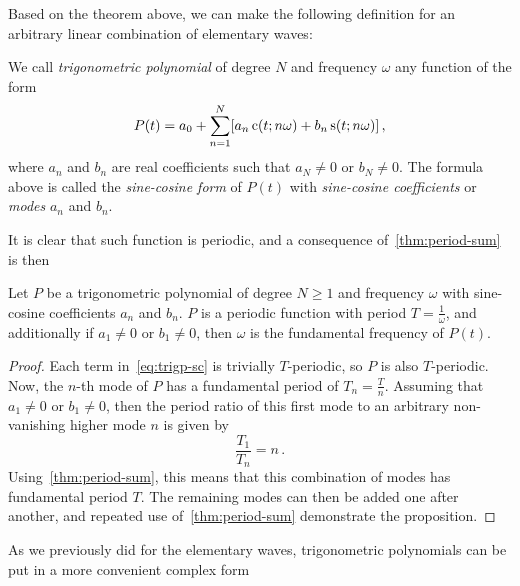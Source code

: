 Based on the theorem above, we can make the following definition for an arbitrary linear
combination of elementary waves:
\begin{definition}
  We call \emph{trigonometric polynomial} of degree $N$ and frequency $\omega$ any
  function of the form
  \begin{equation}
    P(t)=a_0+\sum_{n=1}^N[a_n\,\mathrm{c}(t;n\omega)+b_n\,\mathrm{s}(t;n\omega)]\,,
    \label{eq:trigp-sc}
  \end{equation}
  where $a_n$ and $b_n$ are real coefficients such that $a_N\neq 0$ or $b_N \neq 0$. The
  formula above is called the \emph{sine-cosine form} of $P(t)$ with \emph{sine-cosine
  coefficients} or \emph{modes} $a_n$ and $b_n$.
\end{definition}
It is clear that such function is periodic, and a consequence of~\cref{thm:period-sum} is then
\begin{proposition}
  Let $P$ be a trigonometric polynomial of degree $N\geq 1$ and frequency $\omega$ with
  sine-cosine coefficients $a_n$ and $b_n$. $P$ is a periodic function with period
  $T=\frac{1}{\omega}$, and additionally if $a_1\neq0$ or $b_1\neq0$, then $\omega$ is the
  fundamental frequency of $P(t)$.
\end{proposition}
\begin{proof}
  Each term in~\cref{eq:trigp-sc} is trivially $T$-periodic, so $P$ is also $T$-periodic.
  Now, the $n$-th mode of $P$ has a fundamental period of $T_n=\frac{T}{n}$. Assuming that $a_1\neq0$ or $b_1\neq0$, then the period ratio of this first mode to an arbitrary non-vanishing higher mode $n$ is given by
  \begin{equation}
    \frac{T_1}{T_n}=n\,.
  \end{equation}
  Using~\cref{thm:period-sum}, this means that this combination of modes has fundamental
  period $T$. The remaining modes can then be added one after another, and repeated use
  of~\cref{thm:period-sum} demonstrate the proposition.
\end{proof}
As we previously did for the elementary waves, trigonometric polynomials can be put in a more
convenient complex form
